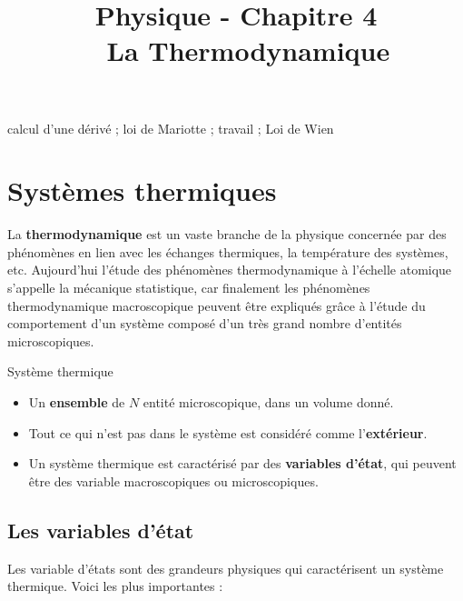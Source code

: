 \documentclass[11pt,a4paper]{article}
\title{\large Physique - Chapitre 4 \\ \LARGE  La Thermodynamique}
\date{}
\author{}
\begin{document}
\maketitle
\vspace{-1cm}
\begin{tcolorbox}[title=Notions de la classe de première à rappeler]
calcul d'une dérivé ; loi de Mariotte ; travail ; Loi de Wien
\end{tcolorbox}
\tableofcontents

\section{Systèmes thermiques}

La \textbf{thermodynamique} est un vaste branche de la physique concernée par des phénomènes en lien avec les échanges thermiques, la température des systèmes, etc. Aujourd'hui l'étude des phénomènes thermodynamique à l'échelle atomique s'appelle la mécanique statistique, car finalement les phénomènes thermodynamique macroscopique peuvent être expliqués grâce à l'étude du comportement d'un système composé d'un très grand nombre d'entités microscopiques. 

\begin{defn}{Système thermique}
\begin{itemize}
    \item Un \textbf{ensemble} de $N$ entité microscopique, dans un volume donné. 
    \item Tout ce qui n'est pas dans le système est considéré comme l'\textbf{extérieur}. 
    \item Un système thermique est caractérisé par des \textbf{variables d'état}, qui peuvent être des variable macroscopiques ou microscopiques. 
\end{itemize}
\end{defn}

\subsection{Les variables d'état}
Les variable d'états sont des grandeurs physiques qui caractérisent un système thermique. Voici les plus importantes :  
\end{document}
